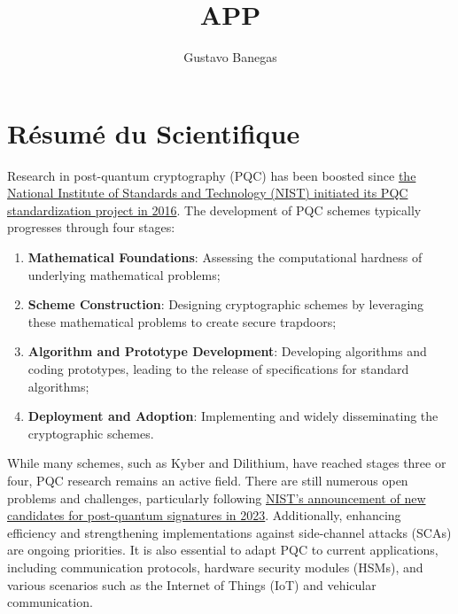 \documentclass[11pt, a4paper]{article}
\begin{document}
\title{APP}
\author{Gustavo Banegas}
\date{}
\maketitle

\section{Résumé du Scientifique}


Research in post-quantum cryptography (PQC) has been boosted since 
\href{https://csrc.nist.gov/projects/post-quantum-cryptography/post-quantum-cryptography-standardization/call-for-proposals}
{the National Institute of Standards and Technology (NIST) initiated its PQC standardization project in 2016}. 
The development of PQC schemes typically progresses through four stages:
\begin{enumerate}
\setlength{\itemsep}{0.1pt}
\item \textbf{Mathematical Foundations}: Assessing the computational hardness of underlying mathematical problems;
\item \textbf{Scheme Construction}: Designing cryptographic schemes by leveraging these mathematical problems to create secure trapdoors;
\item \textbf{Algorithm and Prototype Development}: Developing algorithms and coding prototypes, leading to the release of specifications for standard algorithms;
\item \textbf{Deployment and Adoption}: Implementing and widely disseminating the cryptographic schemes.
\end{enumerate}
While many schemes, such as Kyber and Dilithium, have reached stages three or four, 
PQC research remains an active field. There are still numerous open problems and challenges, 
particularly following \href{https://www.nist.gov/news-events/news/2023/07/nist-announces-additional-digital-signature-candidates-pqc-standardization}
{NIST's announcement of new candidates for post-quantum signatures in 2023}. 
Additionally, enhancing efficiency and strengthening implementations against side-channel attacks (SCAs) 
are ongoing priorities. It is also essential to adapt PQC to current applications, including communication protocols, 
hardware security modules (HSMs), and various scenarios such as the Internet of 
Things (IoT) and vehicular communication.
\end{document}
